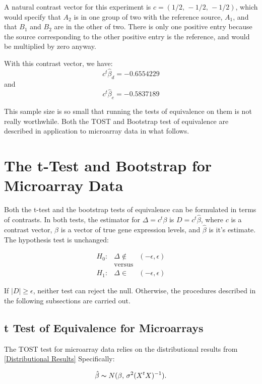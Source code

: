  
A natural contrast vector for this experiment is $c = (1/2,\, -1/2,\, -1/2)$, which would specify that $A_2$ is in one group of two with the reference source, $A_1$, and that $B_1$ and $B_2$ are in the other of two. There is only one positive entry because the source corresponding to the other positive entry is the reference, and would be multiplied by zero anyway. 

With this contrast vector, we have:
\[ c^t\hat{\beta}_d  =  -0.6554229\]
and
\[ c^t\hat{\beta}_e  =  -0.5837189\]

This sample size is so small that running the tests of equivalence on them is not really worthwhile. Both the TOST and Bootstrap test of equivalence are described in application to microarray data in what follows.

\section{The t-Test and Bootstrap for Microarray Data}

Both the t-test and the bootstrap tests of equivalence can be formulated in terms of contrasts. In both tests, the estimator for $\Delta = c^t \beta$ is $D = c^t \hat{\beta}$, where $c$ is a contrast vector, $\beta$ is a vector of true gene expression levels, and $\hat{\beta}$ is it's estimate.  The hypothesis test is unchanged:
 
 \begin{eqnarray} 
 H_0: &  \Delta  \notin & (-\epsilon, \epsilon)   \nonumber \\
 & \mbox{versus}& \label{ToEQ}\\
 H_1: &  \Delta  \in &  (-\epsilon, \epsilon) \nonumber
 \end{eqnarray}
 
 If $|D| \geq \epsilon$, neither test can reject the null. Otherwise, the procedures described in the following subsections are carried out.
 
 \subsection{t Test of Equivalence for Microarrays}

The TOST test for microarray data relies on the distributional results from \ref{Distributional Results} Specifically:

\begin{eqnarray}
 \label{eqn: hatbeta}
 \hat{\beta} \thicksim N(\beta, \,\sigma^2 (X^tX)^{-1}).
  \end{eqnarray}

